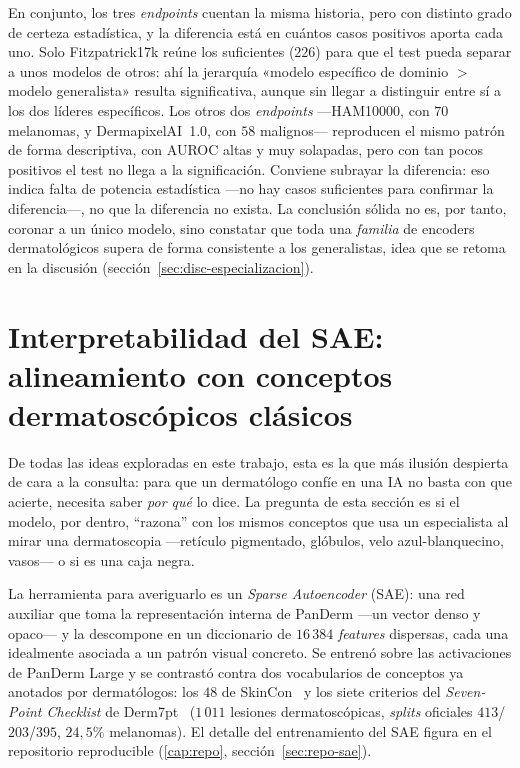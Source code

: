 En conjunto, los tres \emph{endpoints} cuentan la misma historia, pero
con distinto grado de certeza estadística, y la diferencia está en
cuántos casos positivos aporta cada uno. Solo Fitzpatrick17k reúne los
suficientes ($226$) para que el test pueda separar a unos modelos de
otros: ahí la jerarquía «modelo específico de dominio $>$ modelo
generalista» resulta significativa, aunque sin llegar a distinguir entre
sí a los dos líderes específicos. Los otros dos \emph{endpoints}
---HAM10000, con $70$ melanomas, y DermapixelAI~1.0, con $58$ malignos---
reproducen el mismo patrón de forma descriptiva, con AUROC altas y muy
solapadas, pero con tan pocos positivos el test no llega a la
significación. Conviene subrayar la diferencia: eso indica falta de
potencia estadística ---no hay casos suficientes para confirmar la
diferencia---, no que la diferencia no exista. La conclusión sólida no
es, por tanto, coronar a un único modelo, sino constatar que toda una
\emph{familia} de encoders dermatológicos supera de forma consistente a
los generalistas, idea que se retoma en la discusión
(sección~\ref{sec:disc-especializacion}).

\section{Interpretabilidad del SAE: alineamiento con conceptos
dermatoscópicos clásicos}
\label{sec:sae-derm7pt}

De todas las ideas exploradas en este trabajo, esta es la que más
ilusión despierta de cara a la consulta: para que un dermatólogo
confíe en una IA no basta con que acierte, necesita saber \emph{por
qué} lo dice. La pregunta de esta sección es si el modelo, por dentro,
``razona'' con los mismos conceptos que usa un especialista al mirar
una dermatoscopia ---retículo pigmentado, glóbulos, velo
azul-blanquecino, vasos--- o si es una caja negra.

La herramienta para averiguarlo es un \emph{Sparse Autoencoder} (SAE):
una red auxiliar que toma la representación interna de PanDerm ---un
vector denso y opaco--- y la descompone en un diccionario de $16\,384$
\emph{features} dispersas, cada una idealmente asociada a un patrón
visual concreto. Se entrenó sobre las activaciones de PanDerm Large y
se contrastó contra dos vocabularios de conceptos ya anotados por
dermatólogos: los $48$ de SkinCon~\cite{skincon} y los siete criterios
del \emph{Seven-Point Checklist} de Derm7pt~\cite{kawahara2019}
($1\,011$ lesiones dermatoscópicas, \emph{splits} oficiales
$413$/$203$/$395$, $24{,}5\%$ melanomas). El detalle del entrenamiento
del SAE figura en el repositorio reproducible (\ref{cap:repo},
sección~\ref{sec:repo-sae}).

